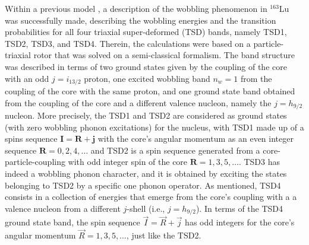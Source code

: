 \documentclass[%
 reprint,
 amsmath,
 amssymb,
 aps,
]{revtex4-2}
\begin{document}
Within a previous model \cite{raduta2020towards}, a description of the wobbling phenomenon in $^{163}$Lu was successfully made, describing the wobbling energies and the transition probabilities for all four triaxial super-deformed (TSD) bands, namely TSD1, TSD2, TSD3, and TSD4. Therein, the calculations were based on a particle-triaxial rotor that was solved on a semi-classical formalism. The band structure was described in terms of two ground states given by the coupling of the core with an odd $j=i_{13/2}$ proton, one excited wobbling band $n_w=1$ from the coupling of the core with the same proton, and one ground state band obtained from the coupling of the core and a different valence nucleon, namely the $j=h_{9/2}$ nucleon. More precisely, the TSD1 and TSD2 are considered as ground states (with zero wobbling phonon excitations) for the nucleus, with TSD1 made up of a spins sequence $\mathbf{I}=\mathbf{R}+\mathbf{j}$ with the core's angular momentum as an even integer sequence $\mathbf{R}=0,2,4,\dots$ and TSD2 is a spin sequence generated from a core-particle-coupling with odd integer spin of the core $\mathbf{R}=1,3,5,\dots$. TSD3 has indeed a wobbling phonon character, and it is obtained by exciting the states belonging to TSD2 by a specific one phonon operator. As mentioned, TSD4 consists in a collection of energies that emerge from the core's coupling with a a valence nucleon from a different $j$-shell (i.e., $j=h_{9/2}$). In terms of the TSD4 ground state band, the spin sequence $\vec{I}=\vec{R}+\vec{j}$ has odd integers for the core's angular momentum $\vec{R}=1,3,5,\dots$, just like the TSD2.
\end{document}
